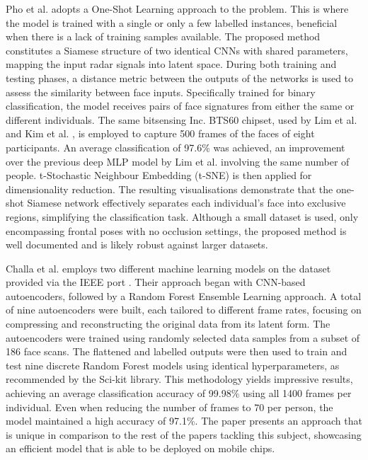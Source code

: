 \documentclass{mpaper}
\begin{document}
Pho et al. \cite{pho2021radar} adopts a One-Shot Learning approach to the problem. This is where the model is trained with a single or only a few labelled instances, beneficial when there is a lack of training samples available. The proposed method constitutes a Siamese structure of two identical CNNs with shared parameters, mapping the input radar signals into latent space. During both training and testing phases, a distance metric between the outputs of the networks is used to assess the similarity between face inputs. Specifically trained for binary classification, the model receives pairs of face signatures from either the same or different individuals. The same bitsensing Inc. BTS60 chipset, used by Lim et al. and Kim et al. \cite{lim2020dnn, kim2020face}, is employed to capture 500 frames of the faces of eight participants. An average classification of 97.6\% was achieved, an improvement over the previous deep MLP model by Lim et al. involving the same number of people. t-Stochastic Neighbour Embedding (t-SNE) \cite{van2008visualizing} is then applied for dimensionality reduction. The resulting visualisations demonstrate that the one-shot Siamese network effectively separates each individual's face into exclusive regions, simplifying the classification task. Although a small dataset is used, only encompassing frontal poses with no occlusion settings, the proposed method is well documented and is likely robust against larger datasets.

Challa et al. \cite{challa2021face} employs two different machine learning models on the dataset provided via the IEEE port \cite{mmwavefacedata}. Their approach began with CNN-based autoencoders, followed by a Random Forest Ensemble Learning approach. A total of nine autoencoders were built, each tailored to different frame rates, focusing on compressing and reconstructing the original data from its latent form. The autoencoders were trained using randomly selected data samples from a subset of 186 face scans. The flattened and labelled outputs were then used to train and test nine discrete Random Forest models using identical hyperparameters, as recommended by the Sci-kit library. This methodology yields impressive results, achieving an average classification accuracy of 99.98\% using all 1400 frames per individual. Even when reducing the number of frames to 70 per person, the model maintained a high accuracy of 97.1\%. The paper presents an approach that is unique in comparison to the rest of the papers tackling this subject, showcasing an efficient model that is able to be deployed on mobile chips.
\end{document}
